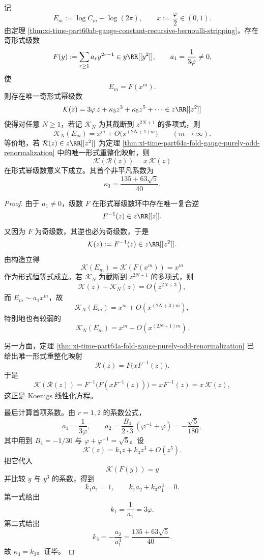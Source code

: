 \begin{theorem}\label{thm:xi-time-part69-fold-gauge-formal-koenigs-linearization}
记
\[
E_m:=\log C_m-\log(2\pi),
\qquad
x:=\frac{\varphi}{2}\in(0,1).
\]
由定理 \ref{thm:xi-time-part60ab-gauge-constant-recursive-bernoulli-stripping}，存在奇形式级数
\[
F(y):=\sum_{r\ge 1}a_r y^{2r-1}\in y\RR[[y^2]],
\qquad
a_1=\frac{1}{3\varphi}\neq 0,
\]
使
\[
E_m=F(x^m).
\]
则存在唯一奇形式幂级数
\[
\mathcal K(z)=3\varphi\,z+\kappa_3 z^3+\kappa_5 z^5+\cdots \in z\RR[[z^2]]
\]
使得对任意 \(N\ge 1\)，若记 \(\mathcal K_N\) 为其截断到 \(z^{2N+1}\) 的多项式，则
\[
\mathcal K_N(E_m)=x^m+O\!\bigl(x^{(2N+1)m}\bigr)
\qquad (m\to\infty).
\]
等价地，若 \(\mathcal R(z)\in z\RR[[z^2]]\) 为定理 \ref{thm:xi-time-part64a-fold-gauge-purely-odd-renormalization} 中的唯一形式重整化映射，则
\[
\mathcal K(\mathcal R(z))=x\,\mathcal K(z)
\]
在形式幂级数意义下成立。其首个非平凡系数为
\[
\kappa_3=\frac{135+63\sqrt5}{40}.
\]
\end{theorem}
\begin{proof}
由于 \(a_1\neq 0\)，级数 \(F\) 在形式幂级数环中存在唯一复合逆
\[
F^{-1}(z)\in z\RR[[z]].
\]
又因为 \(F\) 为奇级数，其逆也必为奇级数，于是
\[
\mathcal K(z):=F^{-1}(z)\in z\RR[[z^2]].
\]
由构造立得
\[
\mathcal K(E_m)=\mathcal K(F(x^m))=x^m
\]
作为形式恒等式成立。若 \(\mathcal K_N\) 为截断到 \(z^{2N+1}\) 的多项式，则
\[
\mathcal K(z)-\mathcal K_N(z)=O(z^{2N+3}),
\]
而 \(E_m\sim a_1x^m\)，故
\[
\mathcal K_N(E_m)=x^m+O(x^{(2N+3)m}),
\]
特别地也有较弱的
\[
\mathcal K_N(E_m)=x^m+O(x^{(2N+1)m}).
\]

另一方面，定理 \ref{thm:xi-time-part64a-fold-gauge-purely-odd-renormalization} 已给出唯一形式重整化映射
\[
\mathcal R(z)=F\!\bigl(xF^{-1}(z)\bigr).
\]
于是
\[
\mathcal K(\mathcal R(z))
=
F^{-1}\!\bigl(F(xF^{-1}(z))\bigr)
=
xF^{-1}(z)
=
x\,\mathcal K(z),
\]
这正是 Koenigs 线性化方程。

最后计算首项系数。由 \(r=1,2\) 的系数公式，
\[
a_1=\frac{1}{3\varphi},
\qquad
a_2=\frac{B_4}{2\cdot 3}\,(\varphi^{-1}+\varphi)
=
-\frac{\sqrt5}{180},
\]
其中用到 \(B_4=-1/30\) 与 \(\varphi+\varphi^{-1}=\sqrt5\)。设
\[
\mathcal K(z)=k_1 z+k_3 z^3+O(z^5).
\]
把它代入
\[
\mathcal K(F(y))=y
\]
并比较 \(y\) 与 \(y^3\) 的系数，得到
\[
k_1a_1=1,
\qquad
k_1a_2+k_3a_1^3=0.
\]
第一式给出
\[
k_1=\frac{1}{a_1}=3\varphi.
\]
第二式给出
\[
k_3=-\frac{a_2}{a_1^4}
=
\frac{135+63\sqrt5}{40}.
\]
故 \(\kappa_3=k_3\)。证毕。
\end{proof}

